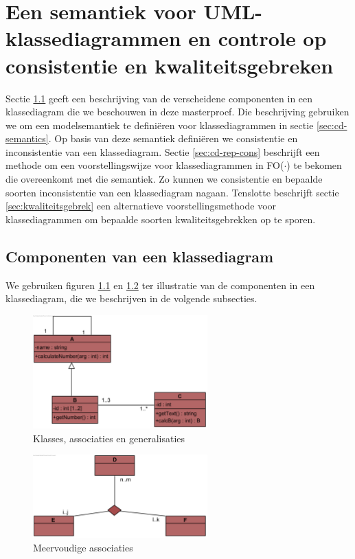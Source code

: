 \chapter{Een semantiek voor UML-klassediagrammen en controle op consistentie en kwaliteitsgebreken}\label{sec:consistentie}
Sectie \ref{sec:cd-components} geeft een beschrijving van de verscheidene componenten in een klassediagram die we beschouwen in deze masterproef. Die beschrijving gebruiken we om een modelsemantiek te defini\"eren voor klassediagrammen in sectie \ref{sec:cd-semantics}. Op basis van deze semantiek defini\"eren we consistentie en inconsistentie van een klassediagram. Sectie \ref{sec:cd-rep-cons} beschrijft een methode om een voorstellingswijze voor klassediagrammen in FO($\cdot$) te bekomen die overeenkomt met die semantiek. Zo kunnen we consistentie en bepaalde soorten inconsistentie van een klassediagram nagaan. Tenslotte beschrijft sectie \ref{sec:kwaliteitsgebrek} een alternatieve voorstellingsmethode voor klassediagrammen om bepaalde soorten kwaliteitsgebrekken op te sporen.

\section{Componenten van een klassediagram}\label{sec:cd-components}

We gebruiken figuren \ref{fig:voorbeeld1} en \ref{fig:voorbeeld2} ter illustratie van de componenten in een klassediagram, die we beschrijven in de volgende subsecties.

\begin{figure}[h]
	\centering
	\includegraphics[width=0.6\textwidth]{chap-consistentie/voorbeeld1.png}
	\caption{Klasses, associaties en generalisaties}
	\label{fig:voorbeeld1}
\end{figure}

\begin{figure}[h]
	\centering
	\includegraphics[width=0.6\textwidth]{chap-consistentie/voorbeeld2.png}
	\caption{Meervoudige associaties}
	\label{fig:voorbeeld2}
\end{figure}

